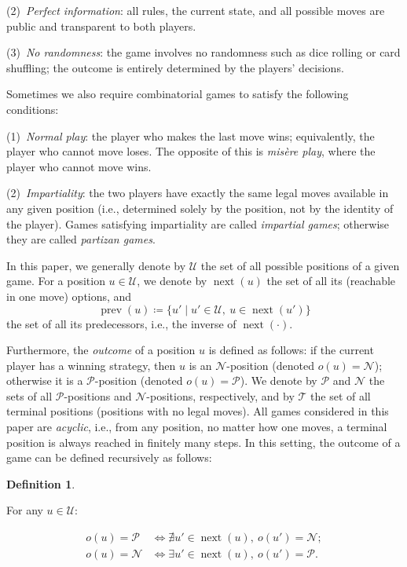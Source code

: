 \documentclass[11pt]{article}
\theoremstyle{definition}
\newtheorem{definition}{Definition}[section]
\theoremstyle{plain}
\newcommand{\varP}{\mathcal{P}}
\newcommand{\varN}{\mathcal{N}}
\newcommand{\varU}{\mathcal{U}}
\newcommand{\varT}{\mathcal{T}}
\newcommand{\nxt}{\operatorname{next}}
\newcommand{\prv}{\operatorname{prev}}
\begin{document}
(2)~\textit{Perfect information}: all rules, the current state, and all possible moves are public and transparent to both players.

(3)~\textit{No randomness}: the game involves no randomness such as dice rolling or card shuffling; the outcome is entirely determined by the players' decisions.

Sometimes we also require combinatorial games to satisfy the following conditions:

(1)~\textit{Normal play}: the player who makes the last move wins; equivalently, the player who cannot move loses.
The opposite of this is \textit{misère play}, where the player who cannot move wins.

(2)~\textit{Impartiality}: the two players have exactly the same legal moves available in any given position (i.e., determined solely by the position, not by the identity of the player).
Games satisfying impartiality are called \textit{impartial games}; otherwise they are called \textit{partizan games}.

In this paper, we generally denote by $\varU$ the set of all possible positions of a given game.
For a position $u\in\varU$, we denote by $\nxt(u)$ the set of all its (reachable in one move) options, and
\[
    \prv(u) \coloneq \{u' \mid u'\in\varU,\ u\in\nxt(u')\}
\]
the set of all its predecessors, i.e., the inverse of $\nxt(\cdot)$.

Furthermore, the \textit{outcome} of a position $u$ is defined as follows: if the current player has a winning strategy, then $u$ is an $\varN$-position (denoted $o(u)=\varN$); otherwise it is a $\varP$-position (denoted $o(u)=\varP$).
We denote by $\varP$ and $\varN$ the sets of all $\varP$-positions and $\varN$-positions, respectively, and by $\varT$ the set of all terminal positions (positions with no legal moves).
All games considered in this paper are \textit{acyclic}, i.e., from any position, no matter how one moves, a terminal position is always reached in finitely many steps.
In this setting, the outcome of a game can be defined recursively as follows:

\begin{definition}\label{def:outcome}

    For any $u\in\varU$:

    \begin{align*}
        o(u)= \varP &\iff \nexists u'\in \nxt(u),\ o(u')=\varN; \\
        o(u)= \varN &\iff \exists  u'\in \nxt(u),\ o(u')=\varP.
    \end{align*}
\end{definition}
\end{document}
